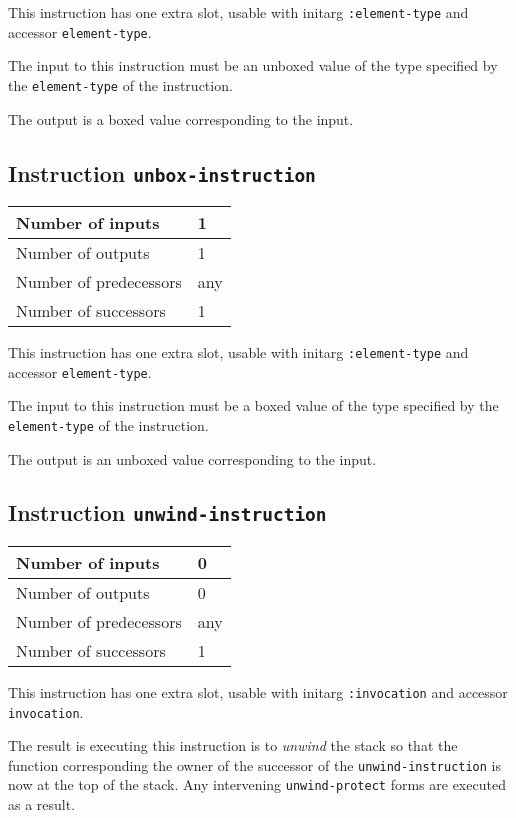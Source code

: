 This instruction has one extra slot, usable with initarg
\texttt{:element-type} and accessor \texttt{element-type}.

The input to this instruction must be an unboxed value of the type
specified by the \texttt{element-type} of the instruction.

The output is a boxed value corresponding to the input.

\subsection{Instruction \texttt{unbox-instruction}}
\label{hir-instruction-unbox}

\begin{tabular}{|l|l|}
\hline
Number of inputs & 1\\
\hline
Number of outputs & 1\\
\hline
Number of predecessors & any\\
\hline
Number of successors & 1\\
\hline
\end{tabular}

This instruction has one extra slot, usable with initarg
\texttt{:element-type} and accessor \texttt{element-type}.

The input to this instruction must be a boxed value of the type
specified by the \texttt{element-type} of the instruction.

The output is an unboxed value corresponding to the input.

\subsection{Instruction \texttt{unwind-instruction}}
\label{hir-instruction-unwind}

\begin{tabular}{|l|l|}
\hline
Number of inputs & 0\\
\hline
Number of outputs & 0\\
\hline
Number of predecessors & any\\
\hline
Number of successors & 1\\
\hline
\end{tabular}

This instruction has one extra slot, usable with initarg
\texttt{:invocation} and accessor \texttt{invocation}.

The result is executing this instruction is to \emph{unwind} the stack
so that the function corresponding the owner of the successor of the
\texttt{unwind-instruction} is now at the top of the stack.  Any
intervening \texttt{unwind-protect} forms are executed as a result.

